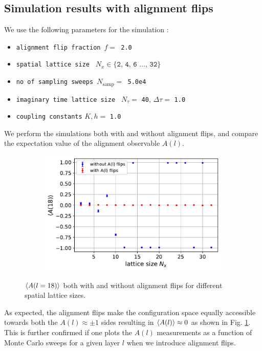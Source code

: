 \documentclass[../thesis_main.tex]{subfiles}
\begin{document}
\subsection{Simulation results with alignment flips}
We use the following parameters for the simulation :
\begin{itemize}[label={}]
    \setlength{\itemsep}{0.1em}
    \item \texttt{alignment flip fraction $f = $ 2.0}
    \item \texttt{spatial lattice size } $N_x \in \{ \texttt{2, 4, 6 $\ldots$, 32} \}$  
    \item \texttt{no of sampling sweeps $N_\text{samp} = $ 5.0e4} 
    \item \texttt{imaginary time lattice size } $N_\tau = $ \texttt{40}, \: $\Delta \tau = $ \texttt{1.0}
    \item \texttt{coupling constants} $K, h = $ \texttt{1.0} 
\end{itemize}
We perform the simulations both with and without alignment flips, and compare the expectation value of the alignment observable $A(l)$. 
\begin{figure}[!htb]
    \centering
    \begin{subfigure}[b]{0.57\textwidth}
        \centering
        \includegraphics[width=\textwidth]{images/fix_subsystem_symmetry/expval(A(l)) vs N_x (l=18) with and without aflips.pdf}
    \end{subfigure}
    \caption{$\expval{A(l = 18)}$ both with and without alignment flips for different spatial lattice sizes.}
    \label{alignflipexpval}
\end{figure}
\FloatBarrier
As expected, the alignment flips make the configuration space equally accessible towards both the $A(l)\approx \pm 1$ sides resulting in $\expval{A(l)} \approx 0$ as shown in Fig. \ref{alignflipexpval}. This is further confirmed if one plots the $A(l)$ measurements as a function of Monte Carlo sweeps for a given layer $l$ when we introduce alignment flips.  
 
\end{document}
